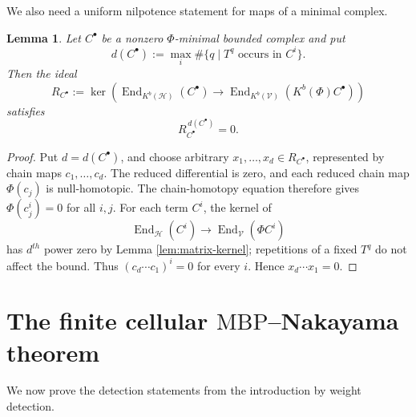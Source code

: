 \documentclass[11pt]{amsart}
\numberwithin{equation}{section}
\newtheorem{lemma}[theorem]{Lemma}
\theoremstyle{definition}
\theoremstyle{remark}
\DeclareMathOperator{\End}{End}
\newcommand{\MBP}{\mathrm{MBP}}
\newcommand{\Hh}{\mathcal H}
\newcommand{\V}{\mathcal V}
\begin{document}
We also need a uniform nilpotence statement for maps of a minimal complex.

\begin{lemma}
\label{lem:minimal-complex-kernel}
Let $C^\bullet$ be a nonzero $\Phi$-minimal bounded complex and put
\[
  d(C^\bullet):=\max_i\#\{q\mid T^q\text{ occurs in }C^i\}.
\]
Then the
ideal
\[
  R_{C^\bullet}:=
  \ker\!\left(
  \End_{K^b(\Hh)}(C^\bullet)
  \longrightarrow
  \End_{K^b(\V)}(K^b(\Phi)C^\bullet)
  \right)
\]
satisfies
\[
  R_{C^\bullet}^{\,d(C^\bullet)}=0.
\]
\end{lemma}

\begin{proof}
Put $d=d(C^\bullet)$, and choose arbitrary
$x_1,\ldots,x_d\in R_{C^\bullet}$, represented by chain maps
$c_1,\ldots,c_d$.  The reduced differential is zero, and each reduced chain
map $\Phi(c_j)$ is null-homotopic.  The chain-homotopy equation therefore
gives $\Phi(c_j^i)=0$ for all $i,j.$
For each term $C^i$, the kernel of
\[
  \End_{\Hh}(C^i)\longrightarrow\End_{\V}(\Phi C^i)
\]
has $d^{th}$ power zero by Lemma \ref{lem:matrix-kernel}; repetitions of a fixed
$T^q$ do not affect the bound.  Thus
$(c_d\cdots c_1)^i=0$
for every $i$.  Hence $x_d\cdots x_1=0$.
\end{proof}

\section{The finite cellular \texorpdfstring{$\MBP$}{MBP}--Nakayama theorem}
\label{sec:nakayama}

We now prove the detection statements from the introduction by weight
detection.
\end{document}
